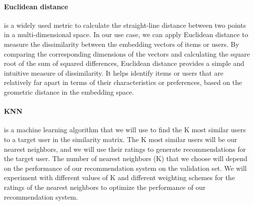 \documentclass[12pt]{article}
\begin{document}
\paragraph{Euclidean distance} is a widely used metric to calculate the straight-line distance between two points in a multi-dimensional space. In our use case, we can apply Euclidean distance to measure the dissimilarity between the embedding vectors of items or users. By comparing the corresponding dimensions of the vectors and calculating the square root of the sum of squared differences, Euclidean distance provides a simple and intuitive measure of dissimilarity. It helps identify items or users that are relatively far apart in terms of their characteristics or preferences, based on the geometric distance in the embedding space.


\paragraph{KNN} is a machine learning algorithm that we will use to find the K most similar users to a target user in the similarity matrix. The K most similar users will be our nearest neighbors, and we will use their ratings to generate recommendations for the target user. The number of nearest neighbors (K) that we choose will depend on the performance of our recommendation system on the validation set. We will experiment with different values of K and different weighting schemes for the ratings of the nearest neighbors to optimize the performance of our recommendation system.  \\


\end{document}
